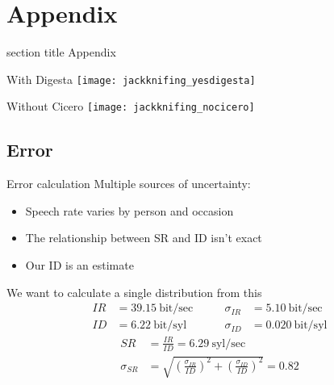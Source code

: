\documentclass{beamer}
\begin{document}
\appendix

\section*{Appendix}
\begin{frame}{}
	\begin{centering}
	\begin{beamercolorbox}[sep=12pt,center]{section title}
	Appendix
	\end{beamercolorbox}
	\end{centering}
\end{frame}

\begin{frame}{With Digesta}
	\texttt{[image: jackknifing\_yesdigesta]}
\end{frame}

\begin{frame}{Without Cicero}
	\texttt{[image: jackknifing\_nocicero]}
\end{frame}

\subsection{Error}
\begin{frame}{Error calculation}
Multiple sources of uncertainty:
\vspace{-1em}
\begin{itemize}
\item Speech rate varies by person and occasion
\item The relationship between SR and ID isn't exact
\item Our ID is an estimate
\end{itemize}
\vspace{-1em}
We want to calculate a single distribution from this
\vspace*{-0.5em}
\begin{align*}
IR &= 39.15~\text{bit/sec} \quad & \quad \sigma_{IR} &= 5.10~\text{bit/sec} \\
ID &= 6.22~\text{bit/syl} \quad & \quad \sigma_{ID} &= 0.020~\text{bit/syl}
\end{align*}
\vspace*{-2em}
\begin{align*}
SR &= \frac{IR}{ID} = 6.29~\text{syl/sec} \\
\sigma_{SR} &= \sqrt{\left(\frac{\sigma_{IR}}{ID}\right)^2 + \left(\frac{\sigma_{ID}}{ID}\right)^2} = 0.82
\end{align*}
\end{frame}
\end{document}
